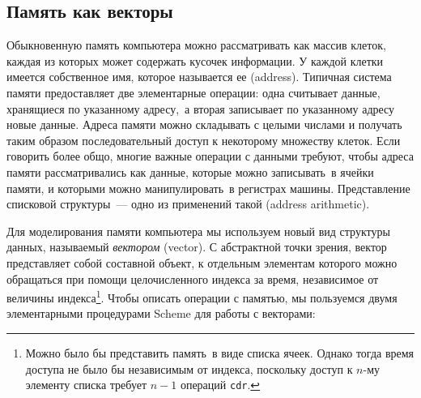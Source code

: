 \subsection{Память как векторы}
\label{MEMORY-AS-VECTORS}


Обыкновенную память компьютера можно рассматривать как
массив клеток, каждая из которых может содержать кусочек информации. У
каждой клетки имеется собственное имя, которое называется ее 
 (address). Типичная система памяти
предоставляет две элементарные операции: одна считывает данные,
хранящиеся по указанному адресу,~а вторая записывает по указанному
адресу новые данные.  Адреса памяти можно складывать с целыми числами
и получать таким образом последовательный доступ к некоторому
множеству клеток.  Если говорить более общо, многие важные операции с
данными требуют, чтобы адреса памяти рассматривались как данные,
которые можно записывать~в ячейки памяти, и которыми можно
манипулировать~в регистрах машины. Представление списковой структуры~--- одно из применений такой  (address arithmetic).

Для моделирования памяти компьютера мы используем новый
вид структуры данных, называемый
{\em вектором} (vector).
С абстрактной точки зрения, вектор представляет собой составной
объект, к отдельным элементам которого можно обращаться при
помощи целочисленного индекса за время, независимое от величины
индекса\footnote{Можно было бы представить память~в виде списка ячеек.
Однако тогда время доступа не было бы независимым от индекса,
поскольку доступ к $n$-му элементу списка требует
$n-1$ операций {\tt cdr}.
}.
Чтобы описать операции с памятью, мы пользуемся двумя элементарными
процедурами Scheme для работы с векторами:

